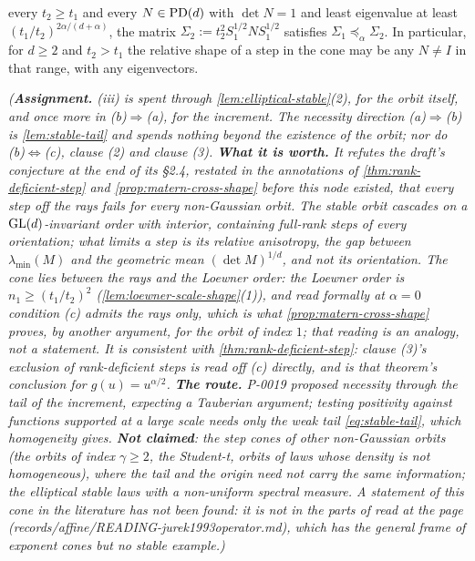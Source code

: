 \begin{proposition}
\begin{enumerate}
every $t_2 \ge t_1$ and every $N \in \mathrm{PD}(d)$ with $\det N = 1$ and least eigenvalue at least
$(t_1/t_2)^{2\alpha/(d+\alpha)}$, the matrix $\Sigma_2 := t_2^2S_1^{1/2}NS_1^{1/2}$ satisfies
$\Sigma_1 \preceq_\alpha \Sigma_2$. In particular, for $d \ge 2$ and $t_2 > t_1$ the relative shape
of a step in the cone may be any $N \ne I$ in that range, with any eigenvectors.
\end{enumerate}
\statusA\quad{}\quad\emph{(\textbf{Assignment.} (iii) is spent through
\ref{lem:elliptical-stable}(2), for the orbit itself, and once more in (b)$\Rightarrow$(a), for the
increment. The necessity direction (a)$\Rightarrow$(b) is \ref{lem:stable-tail} and spends nothing
beyond the existence of the orbit; nor do (b)$\Leftrightarrow$(c), clause (2) and clause (3).
\textbf{What it is worth.} It refutes the draft's conjecture at the end of its \S 2.4, restated in
the annotations of \ref{thm:rank-deficient-step} and \ref{prop:matern-cross-shape} before this node
existed, that every step off the rays fails for every non-Gaussian orbit. The stable orbit cascades
on a $\mathrm{GL}(d)$-invariant order with interior, containing full-rank steps of every orientation; what
limits a step is its relative anisotropy, the gap between $\lambda_{\min}(M)$ and the geometric mean
$(\det M)^{1/d}$, and not its orientation. The cone lies between the rays and the Loewner order:
the Loewner order is $n_1 \ge (t_1/t_2)^2$ (\ref{lem:loewner-scale-shape}(1)), and read formally at
$\alpha = 0$ condition (c) admits the rays only, which is what \ref{prop:matern-cross-shape} proves,
by another argument, for the \Matern{} orbit of index $1$; that reading is an analogy, not a
statement. It is consistent with \ref{thm:rank-deficient-step}: clause (3)'s exclusion of
rank-deficient steps is read off (c) directly, and is that theorem's conclusion for
$g(u) = u^{\alpha/2}$. \textbf{The route.} P-0019 proposed necessity through the tail of the
increment, expecting a Tauberian argument; testing positivity against functions supported at a
large scale needs only the weak tail \ref{eq:stable-tail}, which homogeneity gives. \textbf{Not
claimed}: the step cones of other non-Gaussian orbits (the \Matern{} orbits of index
$\gamma \ge 2$, the Student-t, orbits of laws whose \Levy{} density is not homogeneous), where the
tail and the origin need not carry the same information; the elliptical stable laws with a
non-uniform spectral measure. A statement of this cone in the literature has not been found: it is
not in the parts of  read at the page (records/affine/READING-jurek1993operator.md),
which has the general frame of exponent cones but no stable example.)}
\end{proposition}

